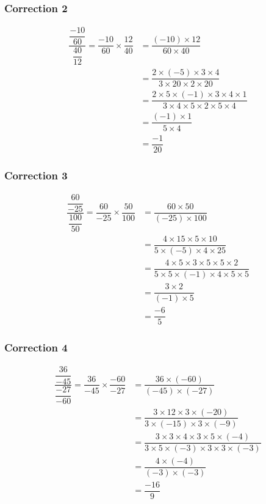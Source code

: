 \documentclass[15pt, mathserif]{beamer}
\begin{document}
\begin{frame}
\vspace{-10mm}
	\frametitle{Correction 2}
	\begin{align*}
	\dfrac{\dfrac{-10}{60}}{\dfrac{40}{12}}=\dfrac{-10}{60} \times \dfrac{12}{40}&= \dfrac{\left(-10\right) \times 12}{60 \times 40}\\
		&=\dfrac{2 \times \left(-5\right) \times 3 \times 4}{3 \times 20 \times 2 \times 20}\\		&=\dfrac{2 \times 5 \times \left(-1\right) \times 3 \times 4 \times 1}{3 \times 4 \times 5 \times 2 \times 5 \times 4}\\		&=\dfrac{\left(-1\right) \times 1}{5 \times 4}\\		&=\dfrac{-1}{20}
	\end{align*}\end{frame}


\begin{frame}
\vspace{-10mm}
	\frametitle{Correction 3}
	\begin{align*}
	\dfrac{\dfrac{60}{-25}}{\dfrac{100}{50}}=\dfrac{60}{-25} \times \dfrac{50}{100}&= \dfrac{60 \times 50}{\left(-25\right) \times 100}\\
		&=\dfrac{4 \times 15 \times 5 \times 10}{5 \times \left(-5\right) \times 4 \times 25}\\		&=\dfrac{4 \times 5 \times 3 \times 5 \times 5 \times 2}{5 \times 5 \times \left(-1\right) \times 4 \times 5 \times 5}\\		&=\dfrac{3 \times 2}{\left(-1\right) \times 5}\\		&=\dfrac{-6}{5}
	\end{align*}\end{frame}


\begin{frame}
\vspace{-10mm}
	\frametitle{Correction 4}
	\begin{align*}
	\dfrac{\dfrac{36}{-45}}{\dfrac{-27}{-60}}=\dfrac{36}{-45} \times \dfrac{-60}{-27}&= \dfrac{36 \times \left(-60\right)}{\left(-45\right) \times \left(-27\right)}\\
		&=\dfrac{3 \times 12 \times 3 \times \left(-20\right)}{3 \times \left(-15\right) \times 3 \times \left(-9\right)}\\		&=\dfrac{3 \times 3 \times 4 \times 3 \times 5 \times \left(-4\right)}{3 \times 5 \times \left(-3\right) \times 3 \times 3 \times \left(-3\right)}\\		&=\dfrac{4 \times \left(-4\right)}{\left(-3\right) \times \left(-3\right)}\\		&=\dfrac{-16}{9}
	\end{align*}\end{frame}
\end{document}
